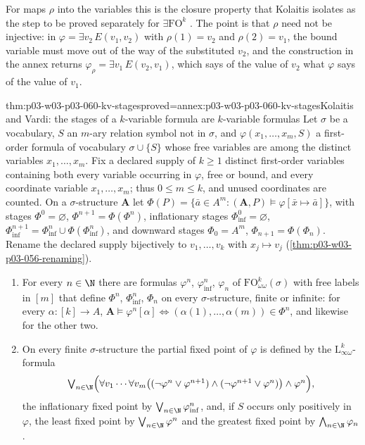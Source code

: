 For maps \(\rho\) into the variables this is the closure property that
Kolaitis isolates as the step to be proved separately for
\(\exists\mathrm{FO}^k\) \cite[proof of Thm.~8.2, p.~70]{Kolaitis2003ExpressivePowerNotes}.
The point is that \(\rho\) need not be injective: in
\(\varphi=\exists v_2\,E(v_1,v_2)\) with \(\rho(1)=v_2\) and \(\rho(2)=v_1\),
the bound variable must move out of the way of the substituted \(v_2\), and
the construction in the annex returns
\(\varphi_\rho=\exists v_1\,E(v_2,v_1)\), which says of the value of \(v_2\)
what \(\varphi\) says of the value of \(v_1\).

\begin{hbtheorem}{thm:p03-w03-p03-060-kv-stages}{proved=annex:p03-w03-p03-060-kv-stages}{Kolaitis and Vardi: the stages of a \(k\)-variable formula are \(k\)-variable formulas}
Let \(\sigma\) be a vocabulary, \(S\) an \(m\)-ary relation symbol not in
\(\sigma\), and \(\varphi(x_1,\ldots,x_m,S)\) a first-order formula of
vocabulary \(\sigma\cup\{S\}\) whose free variables are among the distinct
variables \(x_1,\ldots,x_m\). Fix a declared supply of \(k\ge1\) distinct
first-order variables containing both every variable occurring in
\(\varphi\), free or bound, and every coordinate variable
\(x_1,\ldots,x_m\); thus \(0\le m\le k\), and unused coordinates are
counted. On a \(\sigma\)-structure \(\mathbf A\) let
\(\Phi(P)=\{\bar a\in A^m:(\mathbf A,P)\models\varphi[\bar x\mapsto\bar a]\}\),
with stages \(\Phi^0=\varnothing\), \(\Phi^{n+1}=\Phi(\Phi^n)\),
inflationary stages \(\Phi^0_{\mathrm{inf}}=\varnothing\),
\(\Phi^{n+1}_{\mathrm{inf}}=\Phi^n_{\mathrm{inf}}\cup\Phi(\Phi^n_{\mathrm{inf}})\),
and downward stages \(\Phi_0=A^m\), \(\Phi_{n+1}=\Phi(\Phi_n)\). Rename the
declared supply bijectively to \(v_1,\ldots,v_k\) with
\(x_j\mapsto v_j\) (\cref{thm:p03-w03-p03-056-renaming}).
\begin{enumerate}
\item For every \(n\in\N\) there are formulas \(\varphi^n\),
      \(\varphi^n_{\mathrm{inf}}\), \(\varphi_n\) of
      \(\mathrm{FO}^k_{\omega\omega}(\sigma)\) with free labels in \([m]\)
      that define \(\Phi^n\), \(\Phi^n_{\mathrm{inf}}\), \(\Phi_n\) on every
      \(\sigma\)-structure, finite or infinite: for every
      \(\alpha\colon[k]\to A\),
      \(\mathbf A\models\varphi^n[\alpha]\iff(\alpha(1),\ldots,\alpha(m))\in\Phi^n\),
      and likewise for the other two.
\item On every finite \(\sigma\)-structure the partial fixed point of
      \(\varphi\) is defined by the \(\mathrm{L}^k_{\infty\omega}\)-formula
      \[
       \textstyle\bigvee_{n\in\N}\Bigl(\forall v_1\cdots\forall v_m\bigl((\neg\varphi^n\vee\varphi^{n+1})\wedge(\neg\varphi^{n+1}\vee\varphi^n)\bigr)\wedge\varphi^n\Bigr),
      \]
      the inflationary fixed point by
      \(\bigvee_{n\in\N}\varphi^n_{\mathrm{inf}}\), and, if \(S\) occurs
      only positively in \(\varphi\), the least fixed point by
      \(\bigvee_{n\in\N}\varphi^n\) and the greatest fixed point by
      \(\bigwedge_{n\in\N}\varphi_n\).
\end{enumerate}
\end{hbtheorem}

